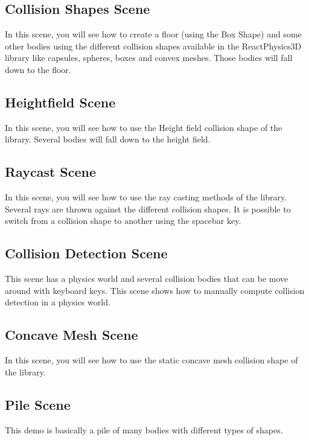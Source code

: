 \documentclass[a4paper,12pt]{article}
\begin{document}
    \subsection{Collision Shapes Scene}

    In this scene, you will see how to create a floor (using the Box Shape) and some other bodies using the different collision shapes available
    in the ReactPhysics3D library like capsules, spheres, boxes and convex meshes. Those bodies will fall down to the floor.

    \subsection{Heightfield Scene}

    In this scene, you will see how to use the Height field collision shape of the library. Several bodies will fall
    down to the height field.

   \subsection{Raycast Scene}

    In this scene, you will see how to use the ray casting methods of the library. Several rays are thrown against the different collision shapes.
    It is possible to switch from a collision shape to another using the spacebar key.

   \subsection{Collision Detection Scene}

    This scene has a physics world and several collision bodies that can be move around with keyboard keys. This scene shows how to manually compute
    collision detection in a physics world.

    \subsection{Concave Mesh Scene}

    In this scene, you will see how to use the static concave mesh collision shape of the library.

    \subsection{Pile Scene}

    This demo is basically a pile of many bodies with different types of shapes.
\end{document}
